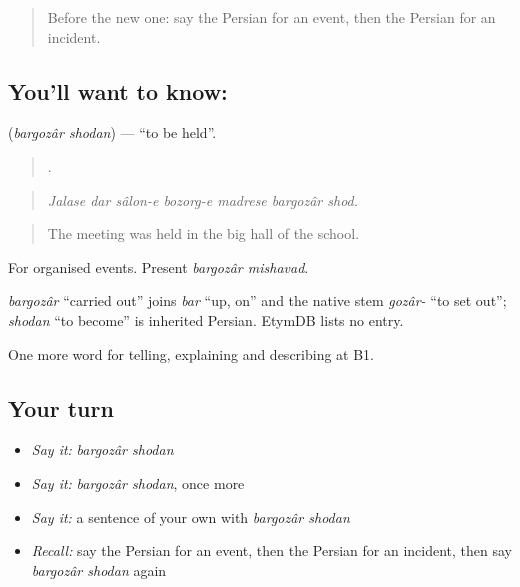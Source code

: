 \label{lesson:FA-C314-bargozar-shodan}



\begin{quote}
Before the new one: say the Persian for an event, then the Persian for an incident.
\end{quote}

\subsection*{You'll want to know:  }
\textbf{ } (\emph{bargozâr shodan}) — \textquotedblleft{}to be held\textquotedblright{}.

\begin{quote}
      .
\end{quote}

\begin{quote}
\emph{Jalase dar sâlon-e bozorg-e madrese bargozâr shod.}
\end{quote}

\begin{quote}
The meeting was held in the big hall of the school.
\end{quote}

For organised events. Present \emph{bargozâr mishavad}.

\begin{cousinweb}
\emph{bargozâr} \textquotedblleft{}carried out\textquotedblright{} joins \emph{bar} \textquotedblleft{}up, on\textquotedblright{} and the native stem \emph{gozâr-} \textquotedblleft{}to set out\textquotedblright{}; \emph{shodan} \textquotedblleft{}to become\textquotedblright{} is inherited Persian. EtymDB lists no entry.
\end{cousinweb}

\begin{grammarlens}[title={What you've built}]
One more word for telling, explaining and describing at B1.
\end{grammarlens}

\subsection*{Your turn}
\begin{itemize}
\raggedright
  \item \emph{Say it:} \emph{bargozâr shodan}
  \item \emph{Say it:} \emph{bargozâr shodan}, once more
  \item \emph{Say it:} a sentence of your own with \emph{bargozâr shodan}
  \item \emph{Recall:} say the Persian for an event, then the Persian for an incident, then say \emph{bargozâr shodan} again
\end{itemize}

